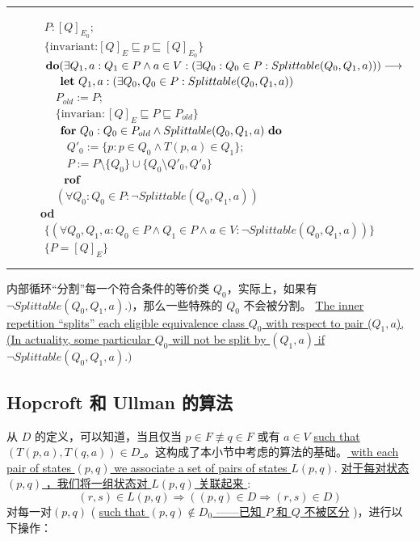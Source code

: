 \\
\rule{\textwidth}{1pt}
\mbox{　　　} $P:[Q]_{E_0};$ \\
\mbox{　　　} $\{ \mbox{invariant:} [Q]_E \sqsubseteq p \sqsubseteq [Q]_{E_0} \}$ \\
\mbox{　　　} $\mbox{\textbf{do}} ( \exists Q_1,a : Q_1 \in P \land a \in V : ( \exists Q_0 : Q_0 \in P : Splittable ( Q_0 , Q_1, a ) ) ) \longrightarrow $ \\
\mbox{　　　　} $ \mbox{ \textbf{let} } Q_1 ,a : ( \exists Q_0,Q_0 \in P : Splittable (Q_0,Q_1,a))  $ \\
\mbox{　　　　} $ P_{old} := P ; $ \\
\mbox{　　　　} $ \{ \mbox{invarian} : [Q]_E \sqsubseteq P \sqsubseteq P_{old}  \} $ \\
\mbox{　　　　} $ \mbox{ \textbf{for} }  Q_0: Q_0 \in P_{old} \land Splittable (Q_0, Q_1, a) \mbox{ \textbf{do} } $ \\
\mbox{　　　　　} $ Q'_0 := \{  p:p \in Q_0 \land T(p,a) \in Q_1 \} ; $ \\
\mbox{　　　　　} $ P:= P \setminus \{  Q_0 \} \cup \{ Q_0 \setminus Q'_0,Q'_0   \} $ \\
\mbox{　　　　} $ \mbox{  \textbf{ rof }} $ \\
\mbox{　　　　} $ (\forall Q_0:Q_0 \in P : \neg Splittable ( Q_0,Q_1,a)) $ \\
\mbox{　　　\textbf{od}}\\
\mbox{　　　} $ \{ (\forall Q_0,Q_1,a : Q_0 \in P \land Q_1 \in P \land a \in V : \neg Splittable (Q_0,Q_1,a))  \} $ \\
\mbox{　　　} $\{  P = [Q]_E \}$ \\
\rule{\textwidth}{1pt}
内部循环“分割”每一个符合条件的等价类 $Q_0$，实际上，如果有$\neg Splittable(Q_0,Q_1,a).)$，那么一些特殊的 $Q_0$ 不会被分割。
\uline{The inner repetition “splits” each eligible equivalence class $Q_0$ with respect to pair ($Q_1,a$), (In actuality, some particular $Q_0$ will not be split by $(Q_1,a)$ if $\neg Splittable(Q_0,Q_1,a).)$}

\subsection{Hopcroft 和 Ullman 的算法 }

从 $D$ 的定义，可以知道，当且仅当 $p \in F \not\equiv q \in F$ 或有 $a\in V$ \uline{such that $(T(p,a),T(q,a)) \in D$ }。这构成了本小节中考虑的算法的基础。\uline{ with each pair of states $(p,q)$ we associate a set of pairs of states $L(p,q)$}. 
\uline{ 对于每对状态 $(p,q)$ ，我们将一组状态对 $L(p,q)$ 关联起来 }:
$$ (r,s) \in L(p,q) \Rightarrow ((p,q) \in D \Rightarrow (r,s) \in D) $$
对每一对$(p,q)$ ( \uline{such that $ (p,q) \not\in D_0 $ ——已知 $P$ 和 $Q$ 不被区分} )，进行以下操作：

